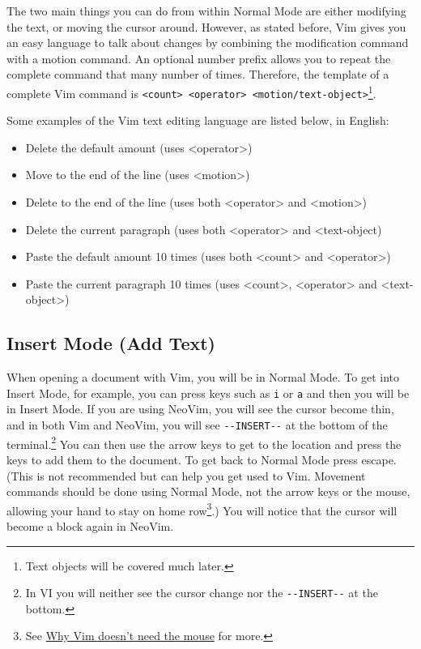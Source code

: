 \documentclass[11pt]{article}
\begin{document}
The two main things you can do from within Normal Mode are either modifying the
text, or moving the cursor around. However, as stated before, Vim gives you
an easy language to talk about changes by combining the modification command
with a motion command. An optional number prefix allows you to repeat the
complete command that many number of times. Therefore, the template of a
complete Vim command is \texttt{<count> <operator> <motion/text-object>}\footnote{Text objects will be covered much later.}.

Some examples of the Vim text editing language are listed below, in English:
\begin{itemize}
\item Delete the default amount (uses <operator>)
\item Move to the end of the line (uses <motion>)
\item Delete to the end of the line (uses both <operator> and <motion>)
\item Delete the current paragraph (uses both <operator> and <text-object)
\item Paste the default amount 10 times (uses both <count> and <operator>)
\item Paste the current paragraph 10 times (uses <count>, <operator> and <text-object>)
\end{itemize}
\subsection{Insert Mode (Add Text)}
\label{sec:org7d1e11f}
When opening a document with Vim, you will be in Normal Mode. To get into Insert
Mode, for example, you can press keys such as \texttt{i} or \texttt{a} and then you will be in
Insert Mode. If you are using NeoVim, you will see the cursor become thin, and
in both Vim and NeoVim, you will see \texttt{-{}-INSERT-{}-} at the bottom of the
terminal.\footnote{In VI you will neither see the cursor change nor the 
\texttt{-{}-INSERT-{}-} at the bottom.} You can then use the arrow keys to get to the location and press
the keys to add them to the document. To get back to Normal Mode press escape.
(This is not recommended but can help you get used to Vim. Movement commands
should be done using Normal Mode, not the arrow keys or the mouse, allowing your
hand to stay on home row\footnote{See \href{https://www.youtube.com/watch?v=tQCRVkSFFEc}{Why Vim doesn't need the mouse} for more.}.) You will notice that the cursor will become a block
again in NeoVim.
\end{document}
